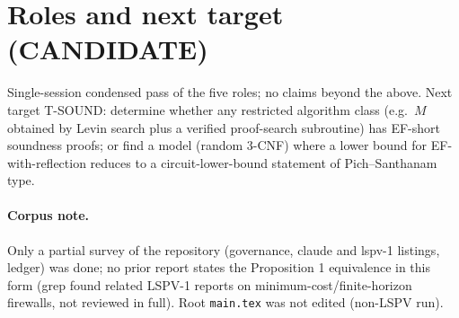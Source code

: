 \documentclass{article}
\begin{document}
\section{Roles and next target (CANDIDATE)}
Single-session condensed pass of the five roles; no claims beyond the above. Next target T-SOUND: determine whether any restricted algorithm class (e.g.\ $M$ obtained by Levin search plus a verified proof-search subroutine) has EF-short soundness proofs; or find a model (random 3-CNF) where a lower bound for EF-with-reflection reduces to a circuit-lower-bound statement of Pich--Santhanam type.

\paragraph{Corpus note.} Only a partial survey of the repository (governance, claude and lspv-1 listings, ledger) was done; no prior report states the Proposition 1 equivalence in this form (grep found related LSPV-1 reports on minimum-cost/finite-horizon firewalls, not reviewed in full). Root \texttt{main.tex} was not edited (non-LSPV run).
\end{document}
